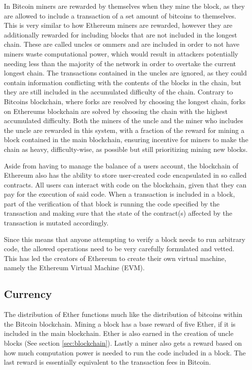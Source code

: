\documentclass{article}
\begin{document}
		In Bitcoin miners are rewarded by themselves when they mine the block, as they are allowed to include a transaction of a set amount of bitcoins to themselves.
		This is very similar to how Ethereum miners are rewarded, however they are additionally rewarded for including blocks that are not included in the longest chain.
		These are called uncles or ommers and are included in order to not have miners waste computational power, which would result in attackers potentially needing less than the majority of the network in order to overtake the current longest chain. 
		The transactions contained in the uncles are ignored, as they could contain information conflicting with the contents of the blocks in the chain, but they are still included in the accumulated difficulty of the chain. Contrary to Bitcoins blockchain, where forks are resolved by choosing the longest chain, forks on Ethereums blockchain are solved by choosing the chain with the highest accumulated difficulty.
		Both the miners of the uncle and the miner who includes the uncle are rewarded in this system, with a fraction of the reward for mining a block contained in the main blockchain, ensuring incentive for miners to make the chain as heavy, difficulty-wise, as possible but still prioritizing mining new blocks.

		Aside from having to manage the balance of a users account, the blockchain of Ethereum also has the ability to store user-created code encapsulated in so called contracts. All users can interact with code on the blockchain, given that they can pay for the execution of said code. 
		When a transaction is included in a block, part of the verification of that block is running the code specified by the transaction and making sure that the state of the contract(s) affected by the transaction is mutated accordingly.

		Since this means that anyone attempting to verify a block needs to run arbitrary code, the allowed operations need to be very carefully formulated and vetted. 
		This has led the creators of Ethereum to create their own virtual machine, namely the Ethereum Virtual Machine (EVM). 

		\subsection{Currency}
		The distribution of Ether functions much like the distribution of bitcoins within the Bitcoin blockchain. 
		Mining a block has a base reward of five Ether, if it is included in the main blockchain.
		Ether is also earned in the creation of uncle blocks (See section \ref{sec:blockchain}).
		Lastly a miner also gets a reward based on how much computation power is needed to run the code included in a block. 
		The last reward is essentially equivalent to the transaction fees in Bitcoin.
\end{document}
